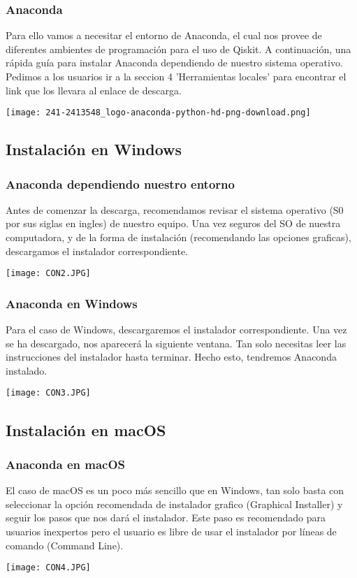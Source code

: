 \documentclass[spanish]{beamer}
\begin{document}
\newpage
\begin{frame}\frametitle{Anaconda}
\setlength{\parskip}{5mm}\justify
Para ello vamos a necesitar el entorno de Anaconda, el cual nos provee de diferentes ambientes de programación para el uso de Qiskit. A continuación, una rápida guía para instalar Anaconda dependiendo de nuestro sistema operativo. Pedimos a los usuarios ir a la seccion 4 'Herramientas locales' para encontrar el link que los llevara al enlace de descarga.

\centering\texttt{[image: 241-2413548\_logo-anaconda-python-hd-png-download.png]}
\end{frame}
\newpage\subsection{Instalación en Windows}
\begin{frame}\frametitle{Anaconda dependiendo nuestro entorno}
\setlength{\parskip}{5mm}\justify
Antes de comenzar la descarga, recomendamos revisar el sistema operativo (S0 por sus siglas en ingles) de nuestro equipo. Una vez seguros del SO de nuestra computadora, y de la forma de instalación (recomendando las opciones graficas), descargamos el instalador correspondiente.

\centering\texttt{[image: CON2.JPG]}

\end{frame}
\newpage
\begin{frame}\frametitle{Anaconda en Windows}
\setlength{\parskip}{5mm}\justify
Para el caso de Windows, descargaremos el instalador correspondiente. Una vez se ha descargado, nos aparecerá la siguiente ventana. Tan solo necesitas leer las instrucciones del instalador hasta terminar. Hecho esto, tendremos Anaconda instalado.

\centering\texttt{[image: CON3.JPG]}

\end{frame}
\newpage\subsection{Instalación en macOS}
\begin{frame}\frametitle{Anaconda en macOS}
\setlength{\parskip}{5mm}\justify
El caso de macOS es un poco más sencillo que en Windows, tan solo basta con seleccionar la opción recomendada de instalador grafico (Graphical Installer) y seguir los pasos que nos dará el instalador. Este paso es recomendado para usuarios inexpertos pero el usuario es libre de usar el instalador por líneas de comando (Command Line).

\centering\texttt{[image: CON4.JPG]}

\end{frame}
\end{document}
